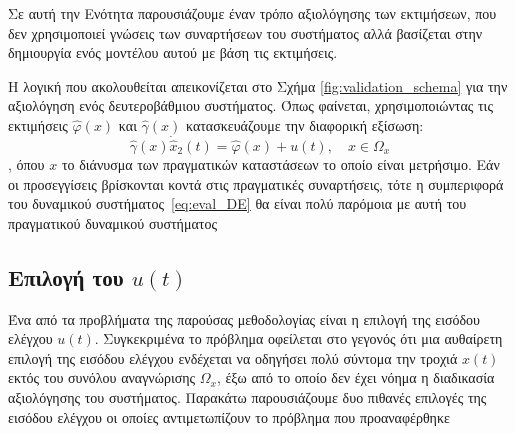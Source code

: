 Σε αυτή την Ενότητα παρουσιάζουμε έναν τρόπο αξιολόγησης των εκτιμήσεων, που δεν χρησιμοποιεί γνώσεις των συναρτήσεων του συστήματος αλλά βασίζεται στην δημιουργία ενός μοντέλου αυτού με βάση τις εκτιμήσεις.

Η λογική που ακολουθείται απεικονίζεται στο Σχήμα \ref{fig:validation_schema} για την αξιολόγηση ενός δευτεροβάθμιου συστήματος. Όπως φαίνεται, χρησιμοποιώντας τις εκτιμήσεις $\hat{\varphi}(x)$ και $\hat{\gamma}(x)$ κατασκευάζουμε την διαφορική εξίσωση:
\begin{equation}
	\hat{\gamma}(x) \dot{\hat{x}}_2(t) = \hat{\varphi}(x) + u(t), 
	\quad x \in \Omega_x
	\label{eq:eval_DE}
\end{equation}
, όπου $x$ το διάνυσμα των πραγματικών καταστάσεων το οποίο είναι μετρήσιμο. Εάν οι προσεγγίσεις βρίσκονται κοντά στις πραγματικές συναρτήσεις, τότε η συμπεριφορά του δυναμικού συστήματος~\eqref{eq:eval_DE} θα είναι πολύ παρόμοια με αυτή του πραγματικού δυναμικού συστήματος

\subsection{Επιλογή του $u(t)$}
Ένα από τα προβλήματα της παρούσας μεθοδολογίας είναι η επιλογή της εισόδου ελέγχου $u(t)$. Συγκεκριμένα το πρόβλημα οφείλεται στο γεγονός ότι μια αυθαίρετη επιλογή της εισόδου ελέγχου ενδέχεται να οδηγήσει πολύ σύντομα την τροχιά $x(t)$ εκτός του συνόλου αναγνώρισης $\Omega_x$, έξω από το οποίο δεν έχει νόημα η διαδικασία αξιολόγησης του συστήματος. Παρακάτω παρουσιάζουμε δυο πιθανές επιλογές της εισόδου ελέγχου οι οποίες αντιμετωπίζουν το πρόβλημα που προαναφέρθηκε


